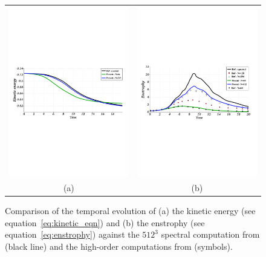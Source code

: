 \begin{figure}[ht!]
    \centering
    \begin{tabular}{cc}
        \includegraphics[width=0.47\linewidth]{chapter3_numerical_methods/pictures/TGV_energy_v2.pdf} &
        \includegraphics[width=0.47\linewidth]{chapter3_numerical_methods/pictures/TGV_enstrophy_v2.pdf} \\
        (a) & (b)
    \end{tabular}
    \caption{Comparison of the temporal evolution of (a) the kinetic energy (see equation~\eqref{eq:kinetic_eqn}) and (b) the enstrophy (see equation~\eqref{eq:enstrophy}) against the $512^3$ spectral computation from \cite{diosady2015case} (black line) and the high-order computations from \cite{giangaspero2015case} (symbols).}
    \label{fig:TGV_comparison}
\end{figure}

